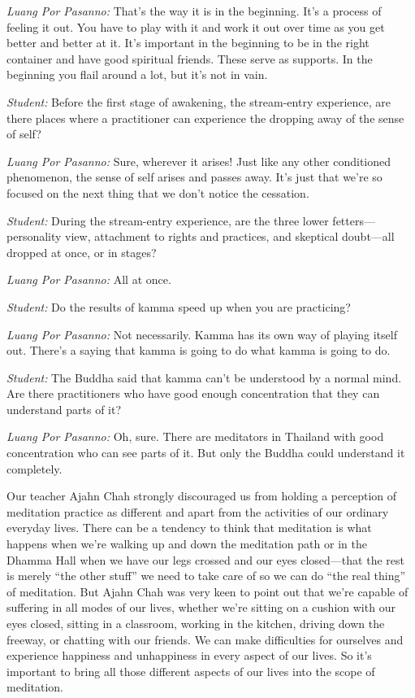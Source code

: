 \emph{Luang Por Pasanno:} That's the way it is in the beginning. It's a 
process of feeling it out. You have to play with it and work it out 
over time as you get better and better at it. It's important in the 
beginning to be in the right container and have good spiritual friends. 
These serve as supports. In the beginning you flail around a lot, but 
it's not in vain.

\emph{Student:} Before the first stage of awakening, the stream-entry 
experience, are there places where a practitioner can experience the 
dropping away of the sense of self?

\emph{Luang Por Pasanno:} Sure, wherever it arises! Just like any other 
conditioned phenomenon, the sense of self arises and passes away. It's 
just that we're so focused on the next thing that we don't notice the 
cessation.

\emph{Student:} During the stream-entry experience, are the three lower 
fetters---personality view, attachment to rights and practices, and 
skeptical doubt---all dropped at once, or in stages?

\emph{Luang Por Pasanno:} All at once.

\emph{Student:} Do the results of kamma speed up when you are 
practicing?

\emph{Luang Por Pasanno:} Not necessarily. Kamma has its own way of 
playing itself out. There's a saying that kamma is going to do what 
kamma is going to do.

\emph{Student:} The Buddha said that kamma can't be understood by a 
normal mind. Are there practitioners who have good enough concentration 
that they can understand parts of it?

\emph{Luang Por Pasanno:} Oh, sure. There are meditators in Thailand 
with good concentration who can see parts of it. But only the Buddha 
could understand it completely.


Our teacher Ajahn Chah strongly discouraged us from holding a 
perception of meditation practice as different and apart from the 
activities of our ordinary everyday lives. There can be a tendency to 
think that meditation is what happens when we're walking up and down 
the meditation path or in the Dhamma Hall when we have our legs crossed 
and our eyes closed---that the rest is merely ``the other stuff'' we 
need to take care of so we can do ``the real thing'' of meditation. But 
Ajahn Chah was very keen to point out that we're capable of suffering 
in all modes of our lives, whether we're sitting on a cushion with our 
eyes closed, sitting in a classroom, working in the kitchen, driving 
down the freeway, or chatting with our friends. We can make 
difficulties for ourselves and experience happiness and unhappiness in 
every aspect of our lives. So it's important to bring all those 
different aspects of our lives into the scope of meditation.

